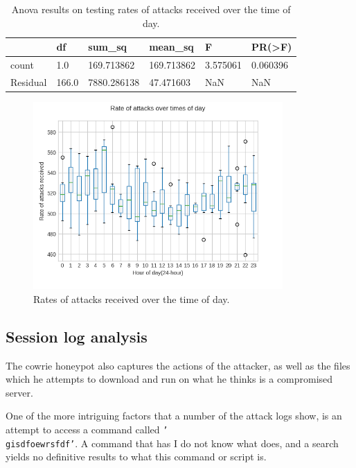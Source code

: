     \begin{table}[H]

        \centering
        \begin{tabular}{|l|l|l|l|l|l|}
        \hline
                 & df    & sum\_sq     & mean\_sq   & F        & PR(\textgreater{}F) \\ \hline
        count    & 1.0   & 169.713862  & 169.713862 & 3.575061 & 0.060396            \\ \hline
        Residual & 166.0 & 7880.286138 & 47.471603  & NaN      & NaN                 \\ \hline
        \end{tabular}
        \caption{Anova results on testing rates of attacks received over the time of day.}
        \label{tab:anova_received}
    \end{table}


    \begin{figure}[H]
        \centering
        \includegraphics[width=0.85\textwidth]{src/images/rate_over_day_received.png}
        \caption{Rates of attacks received over the time of day.}
        \label{fig:over_day}
    \end{figure}

\subsection{Session log analysis}
\label{sec:session_analysis}

    The cowrie honeypot also captures the actions of 
    the attacker, as well as the files which he attempts
    to download and run on what he thinks is a compromised
    server. 


    One of the more intriguing factors that a number of the
    attack logs show, is an attempt to access a command
    called \texttt{'\\gisdfoewrsfdf'}. A command that 
    has I do not know what does, and a search yields no
    definitive results to what this command or script is. 

